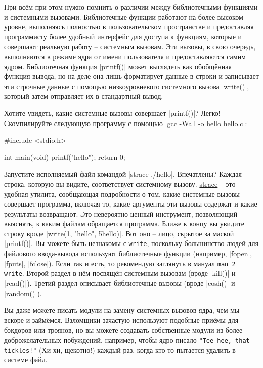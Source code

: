 \documentclass[10pt, oneside]{book}
\begin{document}
При всём при этом нужно помнить о различии между библиотечными функциями и системными вызовами. Библиотечные функции работают на более высоком уровне,
выполняясь полностью в пользовательском пространстве и предоставляя программисту более удобный интерфейс для доступа к функциям, которые и совершают реальную работу – системным вызовам. Эти вызовы, в свою очередь, выполняются в режиме ядра от имени пользователя и предоставляются самим ядром.  Библиотечная функция \cpp|printf()| может выглядеть как обобщённая функция вывода, но на деле она лишь форматирует данные в строки и записывает эти строчные данные с помощью низкоуровневого системного вызова \cpp|write()|, который затем отправляет их в стандартный вывод.

Хотите увидеть, какие системные вызовы совершает \cpp|printf()|?
Легко! Скомпилируйте следующую программу с помощью \sh|gcc -Wall -o hello hello.c|:

\begin{code}
#include <stdio.h>

int main(void)
{
    printf("hello");
    return 0;
}
\end{code}

Запустите исполняемый файл командой \sh|strace ./hello|.
Впечатлены? Каждая строка, которую вы видите, соответствует системному вызову.
\href{https://strace.io/}{strace} – это удобная утилита, сообщающая подробности о том, какие системные вызовы совершает программа, включая то, какие аргументы эти вызовы содержат и какие результаты возвращают.
Это невероятно ценный инструмент, позволяющий выяснять, к каким файлам обращается программа. Ближе к концу вы увидите строку вроде \cpp|write(1, "hello", 5hello)|.
Вот оно – лицо, скрытое за маской \cpp|printf()|.
Вы можете быть незнакомы с \verb|write|, поскольку большинство людей для файлового ввода-вывода используют библиотечные функции (например, \cpp|fopen|, \cpp|fputs|, \cpp|fclose|).
Если так и есть, то рекомендую заглянуть в мануал \verb|man 2 write|.
Второй раздел в нём посвящён системным вызовам (вроде \cpp|kill()| и \cpp|read()|).
Третий раздел описывает библиотечные вызовы (вроде \cpp|cosh()| и \cpp|random()|).

Вы даже можете писать модули на замену системных вызовов ядра, чем мы вскоре и займёмся. Взломщики зачастую используют подобные приёмы для бэкдоров или троянов, но вы можете создавать собственные модули из более доброжелательных побуждений, например, чтобы ядро писало \verb|"Tee hee, that tickles!"| (Хи-хи, щекотно!) каждый раз, когда кто-то пытается удалить в системе файл.
\end{document}

